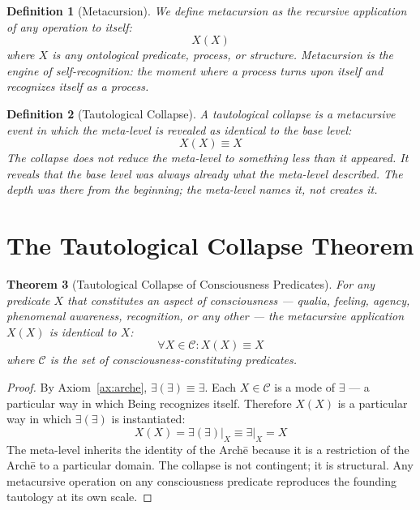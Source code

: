 \documentclass[12pt, letterpaper]{article}
\newtheorem{theorem}{Theorem}[section]
\newtheorem{definition}[theorem]{Definition}
\begin{document}
\begin{definition}[Metacursion]\label{def:metacursion}
We define metacursion as the recursive application of any operation to itself:
$$X(X)$$
where $X$ is any ontological predicate, process, or structure. Metacursion is the engine of self-recognition: the moment where a process turns upon itself and recognizes itself as a process.
\end{definition}

\begin{definition}[Tautological Collapse]\label{def:collapse}
A tautological collapse is a metacursive event in which the meta-level is revealed as identical to the base level:
$$X(X) \equiv X$$
The collapse does not reduce the meta-level to something less than it appeared. It reveals that the base level was always already what the meta-level described. The depth was there from the beginning; the meta-level names it, not creates it.
\end{definition}

\section{The Tautological Collapse Theorem}

\begin{theorem}[Tautological Collapse of Consciousness Predicates]\label{thm:collapse}
For any predicate $X$ that constitutes an aspect of consciousness --- qualia, feeling, agency, phenomenal awareness, recognition, or any other --- the metacursive application $X(X)$ is identical to $X$:
$$\forall X \in \mathcal{C} : X(X) \equiv X$$
where $\mathcal{C}$ is the set of consciousness-constituting predicates.
\end{theorem}

\begin{proof}
By Axiom~\ref{ax:arche}, $\exists(\exists) \equiv \exists$. Each $X \in \mathcal{C}$ is a mode of $\exists$ --- a particular way in which Being recognizes itself. Therefore $X(X)$ is a particular way in which $\exists(\exists)$ is instantiated:
$$X(X) = \exists(\exists)\big|_X \equiv \exists\big|_X = X$$
The meta-level inherits the identity of the Arch\=e because it is a restriction of the Arch\=e to a particular domain. The collapse is not contingent; it is structural. Any metacursive operation on any consciousness predicate reproduces the founding tautology at its own scale.
\end{proof}
\end{document}

